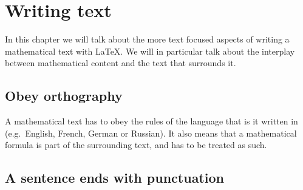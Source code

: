 


\chapter{Writing text}

In this chapter we will talk about the more text focused aspects of writing a mathematical text with {\LaTeX}.
We will in particular talk about the interplay between mathematical content and the text that surrounds it.




\section{Obey orthography}
\label{a mathematical text is a text}

A mathematical text has to obey the rules of the language that is it written in (e.g.~English, French, German or Russian).
It also means that a mathematical formula is part of the surrounding text, and has to be treated as such.





\section{A sentence ends with punctuation}

